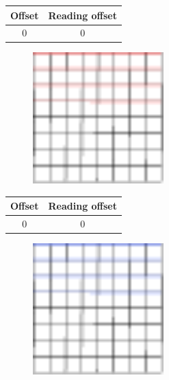 \documentclass{beamer}
\begin{document}
\begin{frame}{}
    \begin{table}
        \centering
        \begin{tabular}{|c|c|}
            \hline
            Offset & Reading offset \\
            \hline
            0 & 0 \\
            \hline
        \end{tabular}
    \end{table}
    \begin{figure}
        \centering
        \includegraphics[width=0.45\textwidth]{grid_3r_1.pdf}
        \label{fig:grid_3r_1}
    \end{figure}
\end{frame}

\begin{frame}{}
    \begin{table}
        \centering
        \begin{tabular}{|c|c|}
            \hline
            Offset & Reading offset \\
            \hline
            0 & 0 \\
            \hline
        \end{tabular}
    \end{table}
    \begin{figure}
        \centering
        \includegraphics[width=0.45\textwidth]{grid_3r_1_ro_1.pdf}
        \label{fig:grid_3r_1_ro_1}
    \end{figure}
\end{frame}
\end{document}
